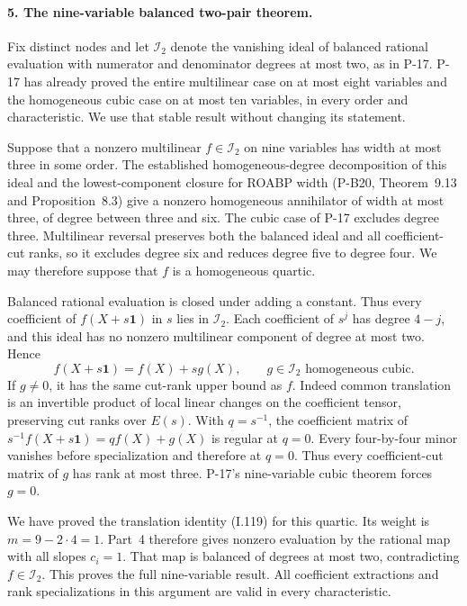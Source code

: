 \paragraph{5. The nine-variable balanced two-pair theorem.}
Fix distinct nodes and let $\mathcal I_2$ denote the vanishing
ideal of balanced rational evaluation with numerator and
denominator degrees at most two, as in P-17. P-17 has already
proved the entire multilinear case on at most eight variables
and the homogeneous cubic case on at most ten variables, in
every order and characteristic. We use that stable result
without changing its statement.

Suppose that a nonzero multilinear $f\in\mathcal I_2$ on nine
variables has width at most three in some order. The established
homogeneous-degree decomposition of this ideal and the
lowest-component closure for ROABP width (P-B20, Theorem~9.13
and Proposition~8.3) give a nonzero homogeneous annihilator of
width at most three, of degree between three and six. The cubic
case of P-17 excludes degree three. Multilinear reversal
preserves both the balanced ideal and all coefficient-cut ranks,
so it excludes degree six and reduces degree five to degree
four. We may therefore suppose that $f$ is a homogeneous
quartic.

Balanced rational evaluation is closed under adding a constant.
Thus every coefficient of $f(X+s\mathbf1)$ in $s$ lies in
$\mathcal I_2$. Each coefficient of $s^j$ has degree $4-j$,
and this ideal has no nonzero multilinear component of degree
at most two. Hence
\[
 f(X+s\mathbf1)=f(X)+s g(X),
 \qquad g\in\mathcal I_2\text{ homogeneous cubic}.
 \tag{I.128}
\]
If $g\ne0$, it has the same cut-rank upper bound as $f$.
Indeed common translation is an invertible product of local
linear changes on the coefficient tensor, preserving cut ranks
over $E(s)$. With $q=s^{-1}$, the coefficient matrix of
$s^{-1}f(X+s\mathbf1)=qf(X)+g(X)$ is regular at $q=0$.
Every four-by-four minor vanishes before specialization and
therefore at $q=0$. Thus every coefficient-cut matrix of $g$
has rank at most three. P-17's nine-variable cubic theorem
forces $g=0$.

We have proved the translation identity (I.119) for this
quartic. Its weight is $m=9-2\cdot4=1$. Part~4 therefore gives
nonzero evaluation by the rational map with all slopes $c_i=1$.
That map is balanced of degrees at most two, contradicting
$f\in\mathcal I_2$. This proves the full nine-variable result.
All coefficient extractions and rank specializations in this
argument are valid in every characteristic.

